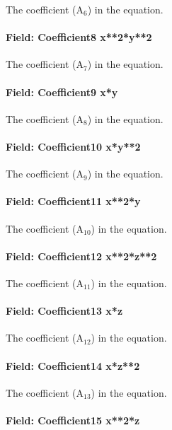 The coefficient (A\(_{6}\)) in the equation.

\paragraph{Field: Coefficient8 x**2*y**2}\label{field-coefficient8-x2y2}

The coefficient (A\(_{7}\)) in the equation.

\paragraph{Field: Coefficient9 x*y}\label{field-coefficient9-xy}

The coefficient (A\(_{8}\)) in the equation.

\paragraph{Field: Coefficient10 x*y**2}\label{field-coefficient10-xy2-1}

The coefficient (A\(_{9}\)) in the equation.

\paragraph{Field: Coefficient11 x**2*y}\label{field-coefficient11-x2y}

The coefficient (A\(_{10}\)) in the equation.

\paragraph{Field: Coefficient12 x**2*z**2}\label{field-coefficient12-x2z2}

The coefficient (A\(_{11}\)) in the equation.

\paragraph{Field: Coefficient13 x*z}\label{field-coefficient13-xz}

The coefficient (A\(_{12}\)) in the equation.

\paragraph{Field: Coefficient14 x*z**2}\label{field-coefficient14-xz2}

The coefficient (A\(_{13}\)) in the equation.

\paragraph{Field: Coefficient15 x**2*z}\label{field-coefficient15-x2z}

